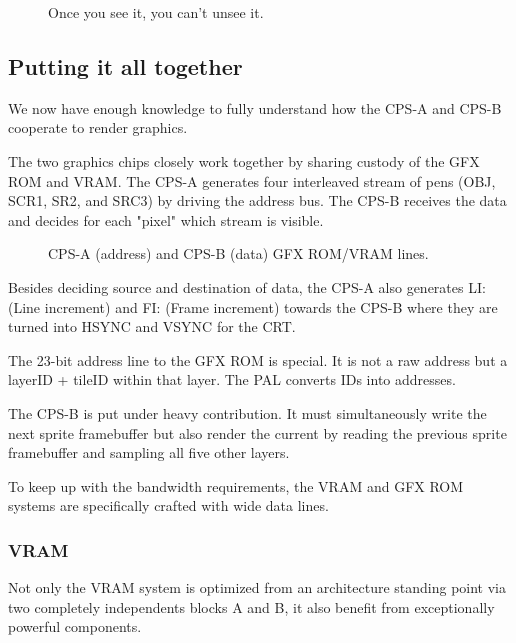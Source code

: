 \begin{figure}[H]
 \caption*{Once you see it, you can't unsee it.}%
 \end{figure}%



\subsection{Putting it all together}

We now have enough knowledge to fully understand how the CPS-A and CPS-B cooperate to render graphics.

The two graphics chips closely work together by sharing custody of the GFX ROM and VRAM. The CPS-A generates four interleaved stream of pens (OBJ, SCR1, SR2, and SRC3) by driving the address bus. The CPS-B receives the data and decides for each "pixel" which stream is visible. 

\begin{figure}[H]
\caption*{CPS-A (address) and CPS-B (data) GFX ROM/VRAM lines.}
\end{figure}

Besides deciding source and destination of data, the CPS-A also generates LI: (Line increment) and FI: (Frame increment) towards the CPS-B where they are turned into HSYNC and VSYNC for the CRT.

The 23-bit address line to the GFX ROM is special. It is not a raw address but a layerID + tileID within that layer. The PAL  converts IDs into addresses.


The CPS-B is put under heavy contribution. It must simultaneously write the next sprite framebuffer but also render the current by reading the previous sprite framebuffer and sampling all five other layers.


To keep up with the bandwidth requirements, the VRAM and GFX ROM systems are specifically crafted with wide data lines.








\subsubsection{VRAM}
Not only the VRAM system is optimized from an architecture standing point via two completely independents blocks A and B, it also benefit from exceptionally powerful components.

